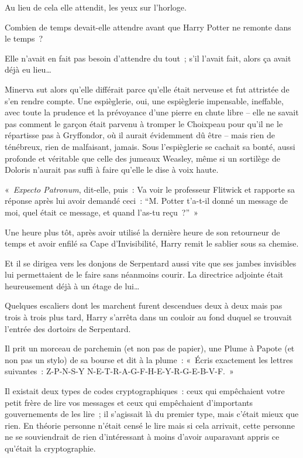 Au lieu de cela elle attendit, les yeux sur l'horloge.

Combien de temps devait-elle attendre avant que Harry Potter ne remonte dans le temps~?

Elle n'avait en fait pas besoin d'attendre du tout~; s'il l'avait fait, alors ça avait déjà eu lieu…

Minerva sut alors qu'elle différait parce qu'elle était nerveuse et fut attristée de s'en rendre compte.
Une espièglerie, oui, une espièglerie impensable, ineffable, avec toute la prudence et la prévoyance d'une pierre en chute libre -- elle ne savait pas comment le garçon était parvenu à tromper le Choixpeau pour qu'il ne le répartisse pas à Gryffondor, où il aurait évidemment dû être -- mais rien de ténébreux, rien de malfaisant, jamais.
Sous l'espièglerie se cachait sa bonté, aussi profonde et véritable que celle des jumeaux Weasley, même si un sortilège de Doloris n'aurait pas suffi à faire qu'elle le dise à voix haute.

«~\emph{Expecto Patronum}, dit-elle, puis~: Va voir le professeur Flitwick et rapporte sa réponse après lui avoir demandé ceci~: “M. Potter t'a-t-il donné un message de moi, quel était ce message, et quand l'as-tu reçu~?”~»

\later

Une heure plus tôt, après avoir utilisé la dernière heure de son retourneur de temps et avoir enfilé sa Cape d'Invisibilité, Harry remit le sablier sous sa chemise.

Et il se dirigea vers les donjons de Serpentard aussi vite que ses jambes invisibles lui permettaient de le faire sans néanmoins courir.
La directrice adjointe était heureusement déjà à un étage de lui…

Quelques escaliers dont les marchent furent descendues deux à deux mais pas trois à trois plus tard, Harry s'arrêta dans un couloir au fond duquel se trouvait l'entrée des dortoirs de Serpentard.

Il prit un morceau de parchemin (et non pas de papier), une Plume à Papote (et non pas un stylo) de sa bourse et dit à la plume~: «~Écris exactement les lettres suivantes~: Z-P-N-S-Y N-E-T-R-A-G-F-H-E-Y-R-G-E-B-V-F.~»

Il existait deux types de codes cryptographiques~: ceux qui empêchaient votre petit frère de lire vos messages et ceux qui empêchaient d'importants gouvernements de les lire~; il s'agissait là du premier type, mais c'était mieux que rien.
En théorie personne n'était censé le lire mais si cela arrivait, cette personne ne se souviendrait de rien d'intéressant à moins d'avoir auparavant appris ce qu'était la cryptographie.

